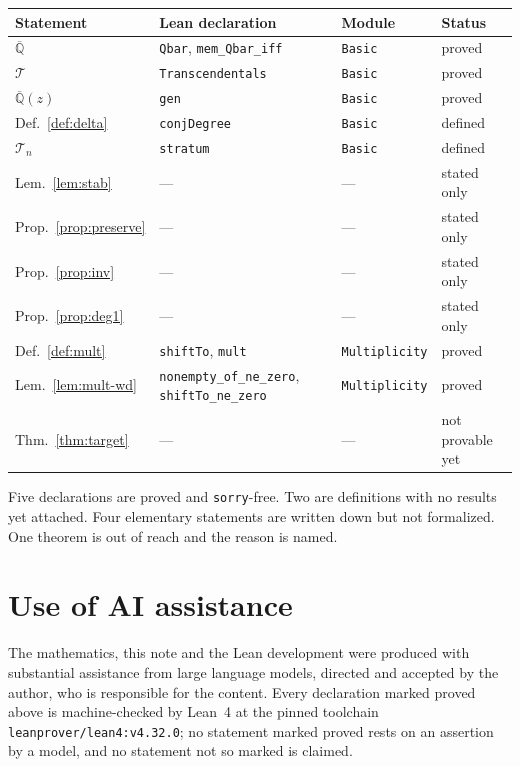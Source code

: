 \documentclass[11pt]{article}
\theoremstyle{plain}
\theoremstyle{definition}
\theoremstyle{remark}
\newcommand{\Q}{\mathbb{Q}}
\newcommand{\Alg}{\overline{\Q}}
\newcommand{\Tc}{\mathcal{T}}
\newcommand{\lean}[1]{\textup{\texttt{#1}}}
\begin{document}
\begin{center}
\begin{tabular}{llll}
\hline
Statement & Lean declaration & Module & Status\\
\hline
$\Alg$ & \lean{Qbar}, \lean{mem\_Qbar\_iff} & \lean{Basic} & proved\\
$\Tc$ & \lean{Transcendentals} & \lean{Basic} & proved\\
$\Alg(z)$ & \lean{gen} & \lean{Basic} & proved\\
Def.~\ref{def:delta} & \lean{conjDegree} & \lean{Basic} & defined\\
$\Tc_n$ & \lean{stratum} & \lean{Basic} & defined\\
Lem.~\ref{lem:stab} & --- & --- & stated only\\
Prop.~\ref{prop:preserve} & --- & --- & stated only\\
Prop.~\ref{prop:inv} & --- & --- & stated only\\
Prop.~\ref{prop:deg1} & --- & --- & stated only\\
Def.~\ref{def:mult} & \lean{shiftTo}, \lean{mult} & \lean{Multiplicity} & proved\\
Lem.~\ref{lem:mult-wd} & \lean{nonempty\_of\_ne\_zero}, \lean{shiftTo\_ne\_zero} & \lean{Multiplicity} & proved\\
Thm.~\ref{thm:target} & --- & --- & not provable yet\\
\hline
\end{tabular}
\end{center}

Five declarations are proved and \lean{sorry}-free. Two are definitions with no
results yet attached. Four elementary statements are written down but not
formalized. One theorem is out of reach and the reason is named.

\section*{Use of AI assistance}

The mathematics, this note and the Lean development were produced with
substantial assistance from large language models, directed and accepted by the
author, who is responsible for the content. Every declaration marked proved
above is machine-checked by Lean~4 at the pinned toolchain
\texttt{leanprover/lean4:v4.32.0}; no statement marked proved rests on an
assertion by a model, and no statement not so marked is claimed.
\end{document}
